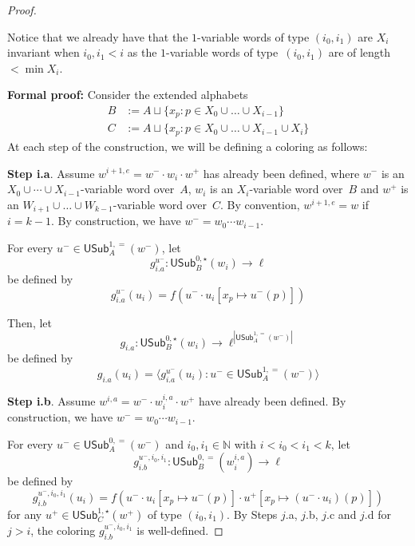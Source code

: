 \documentclass{article}
\numberwithin{theorem}{section}
\newcommand{\quentin}[1]{\textcolor{green}{#1}}
\newcommand{\NN}{\mathbb{N}}
\newcommand{\USub}{\mathsf{USub}}
\begin{document}
\begin{proof}
\begin{itemize}
\end{itemize}  

Notice that we already have that the $1$-variable words of type $(i_0,i_1)$ are $X_i$ invariant when $i_0,i_1 < i$ as the $1$-variable words of type~$(i_0,i_1)$ are of length $< \min X_i$.
\smallskip

\noindent
\textbf{Formal proof:} Consider the extended alphabets 
\begin{align*}
    B &:= A \sqcup \{x_p : p \in X_0 \cup \dots \cup X_{i-1}\}\\
    C &:= A \sqcup \{x_p : p \in X_0 \cup \dots \cup X_{i-1} \cup X_i\}
\end{align*}
At each step of the construction, we will be defining a coloring as follows:
\smallskip

\noindent
\textbf{Step i.a}. 
Assume $w^{i+1,e} = w^- \cdot w_i \cdot w^+$ has already been defined, where $w^-$ is an $X_0 \cup \cdots \cup X_{i-1}$-variable word over~$A$, $w_i$ is an $X_i$-variable word over~$B$ and $w^+$ is an $W_{i+1} \cup \dots \cup W_{k-1}$-variable word over~$C$. By convention,  $w^{i+1,e} = w$ if $i = k-1$. By construction, we have $w^- = w_0 \cdots w_{i-1}$.

For every $u^- \in \USub_A^{1,=}(w^-)$, let $$g_{i.a}^{u^-} : \USub_{B}^{0,\star}(w_i) \to \ell$$ be defined by
$$g_{i.a}^{u^-}(u_i) = f(u^- \cdot u_i[x_p \mapsto u^-(p)])$$

Then, let $$g_{i.a} : \USub_{B}^{0,\star}(w_i) \to \ell^{|\USub_A^{1,=}(w^-)|}$$ be defined by $$g_{i.a}(u_i) = \langle g_{i.a}^{u^-}(u_i) : u^- \in \USub_A^{1,=}(w^-)\rangle$$
\smallskip

\noindent
\textbf{Step i.b}. Assume $w^{i,a} = w^- \cdot w^{i,a}_i \cdot w^+$ have already been defined. By construction, we have $w^- = w_0 \cdots w_{i-1}$.

For every $u^- \in \USub_A^{0,=}(w^-)$ and $i_0,i_1 \in \NN$ with $i < i_0 < i_1 < k$, let $$g_{i.b}^{u^-,i_0,i_1} : \USub_{B}^{0,=}(w^{i,a}_i) \to \ell$$ be defined by $$g_{i.b}^{u^-, i_0, i_1}(u_i) = f(u^- \cdot u_i[x_p \mapsto u^-(p)] \cdot u^+[x_p \mapsto (u^- \cdot u_i)(p)])$$ for any $u^+ \in \USub_C^{1,\star}(w^+)$ of type $(i_0, i_1)$. By Steps $j$.a, $j$.b, $j$.c and $j$.d for $j > i$, the coloring $g_{i.b}^{u^-, i_0, i_1}$ is well-defined.


\end{proof}
\end{document}

